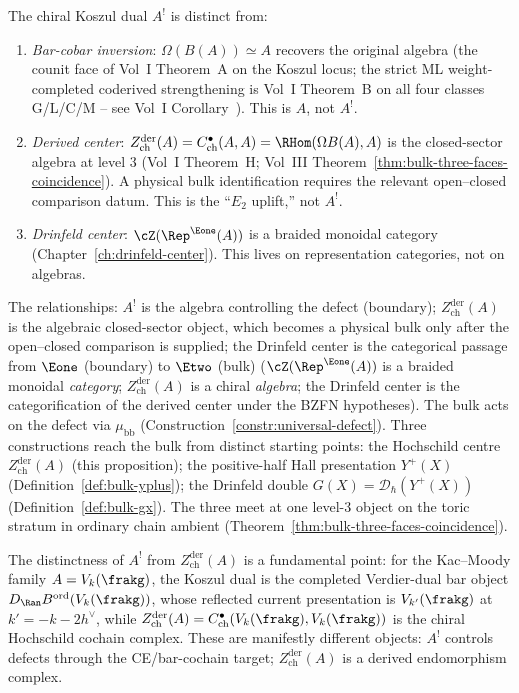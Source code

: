 \begin{proposition}
\label{prop:three-dualities}
The chiral Koszul dual $A^!$ is distinct from:
\begin{enumerate}[label=\textup{(\roman*)}]
 \item \emph{Bar-cobar inversion}: $\Omega(B(A)) \simeq A$ recovers the original algebra (the counit face of Vol~I Theorem~A on the Koszul locus; the strict ML weight-completed coderived strengthening is Vol~I Theorem~B on all four classes G/L/C/M -- see Vol~I Corollary~\cite{VolI}). This is $A$, not $A^!$.
 \item \emph{Derived center}: $Z^{\mathrm{der}}_{\mathrm{ch}}(A)
 = C^\bullet_{\mathrm{ch}}(A, A) = \RHom(\Omega B(A), A)$ is the
 closed-sector algebra at level $3$ (Vol~I Theorem~H; Vol~III
 Theorem~\ref{thm:bulk-three-faces-coincidence}). A physical bulk
 identification requires the relevant open--closed comparison datum.
 This is the ``$E_2$ uplift,'' not $A^!$.
 \item \emph{Drinfeld center}: $\cZ(\Rep^{\Eone}(A))$ is a braided monoidal category (Chapter~\ref{ch:drinfeld-center}). This lives on representation categories, not on algebras.
\end{enumerate}
The relationships: $A^!$ is the algebra controlling the defect
(boundary); $Z^{\mathrm{der}}_{\mathrm{ch}}(A)$ is the algebraic
closed-sector object, which becomes a physical bulk only after the
open--closed comparison is supplied; the Drinfeld center is the
categorical passage from $\Eone$ (boundary) to $\Etwo$ (bulk)
($\cZ(\Rep^{\Eone}(A))$ is a braided monoidal \emph{category};
$Z^{\mathrm{der}}_{\mathrm{ch}}(A)$ is a chiral \emph{algebra}; the
Drinfeld center is the categorification of the derived center under
the BZFN hypotheses). The bulk acts on the defect via
$\mu_{\mathrm{bb}}$ (Construction~\ref{constr:universal-defect}).
Three constructions reach the bulk from distinct starting points: the
Hochschild centre $Z^{\mathrm{der}}_{\mathrm{ch}}(A)$ (this
proposition); the positive-half Hall presentation $Y^{+}(X)$
(Definition~\ref{def:bulk-yplus}); the Drinfeld double
$G(X)=\mathcal D_\hbar(Y^{+}(X))$ (Definition~\ref{def:bulk-gx}).
The three meet at one level-$3$ object on the toric stratum in
ordinary chain ambient
(Theorem~\ref{thm:bulk-three-faces-coincidence}).

The distinctness of $A^!$ from $Z^{\mathrm{der}}_{\mathrm{ch}}(A)$ is a fundamental point: for the Kac--Moody family $A = V_k(\frakg)$, the Koszul dual is the completed Verdier-dual bar object $D_{\Ran}B^{\mathrm{ord}}(V_k(\frakg))$, whose reflected current presentation is $V_{k'}(\frakg)$ at $k' = -k - 2h^\vee$, while $Z^{\mathrm{der}}_{\mathrm{ch}}(A) = C^\bullet_{\mathrm{ch}}(V_k(\frakg), V_k(\frakg))$ is the chiral Hochschild cochain complex. These are manifestly different objects: $A^!$ controls defects through the CE/bar-cochain target; $Z^{\mathrm{der}}_{\mathrm{ch}}(A)$ is a derived endomorphism complex.
\end{proposition}

